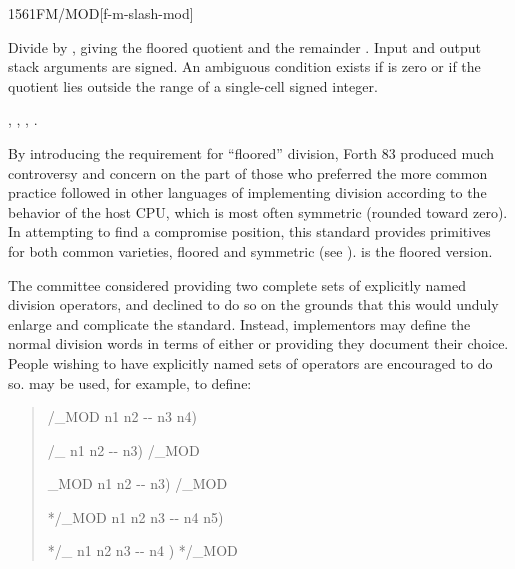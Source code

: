 \begin{worddef}{1561}{FM/MOD}[f-m-slash-mod]
\item {}

	Divide  by , giving the floored quotient
	 and the remainder . Input and output stack
	arguments are signed. An ambiguous condition exists if
	 is zero or if the quotient lies outside the range of
	a single-cell signed integer.

\see {},
	,
	,
	.

	\begin{rationale} %
		By introducing the requirement for ``floored'' division,
		Forth 83 produced much controversy and concern on the part of
		those who preferred the more common practice followed in other
		languages of implementing division according to the behavior
		of the host CPU, which is most often symmetric (rounded toward
		zero). In attempting to find a compromise position, this
		standard provides primitives for both common varieties, floored
		and symmetric (see ).  is the floored
		version.

		The committee considered providing two complete sets
		of explicitly named division operators, and declined to do so
		on the grounds that this would unduly enlarge and complicate
		the standard. Instead, implementors may define the normal
		division words in terms of either  or
		 providing they document their choice. People
		wishing to have explicitly named sets of operators are
		encouraged to do so.  may be used, for example,
		to define:

		\begin{quote}\ttfamily
			\word{:} /\_MOD  n1 n2 -{}- n3 n4)
				   
			\word{;}

			\word{:} /\_  n1 n2 -{}- n3)
				/\_MOD  
			\word{;}

			\word{:} \_MOD  n1 n2 -{}- n3)
				/\_MOD 
			\word{;}

			\word{:} */\_MOD  n1 n2 n3 -{}- n4 n5)
				   
			\word{;}

			\word{:} */\_  n1 n2 n3 -{}- n4 )
				*/\_MOD  
			\word{;}
		\end{quote}
	\end{rationale}


\end{worddef}
